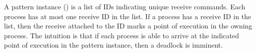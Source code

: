 A pattern instance (\rcvp) is a list of IDs indicating unique receive commands. Each process has at most one
receive ID in the list. If a process has a receive ID in the list, then the receive attached to the ID marks a point of execution in
the owning process. The intuition is that if each process is able to
arrive at the indicated point of execution in the pattern instance, then a deadlock is imminent.








\newsavebox{\boxLangSyntax}

\begin{lrbox}{\boxLangSyntax}
\begin{minipage}[c]{0.3\linewidth}
\cfgstart
{}
\cfgrule{\thread}{\lp\cfgnt{\cmd}~$\ldots$~$\bot$\rp}
\cfgrule{\cmd}{\lp\cfgt{\sendi}~\cfgt{\aid}~\cfgt{\num}~\cfgt{\num}\rp}
   \cfgorline{\lp\cfgt{\recvi}~\cfgt{\aid}~\cfgt{\num}~\cfgt{\num}~\cfgt{\aid}\rp}
   \cfgorline{\lp\cfgt{\wait}~\cfgt{\aid}\rp}
   \cfgorline{\lp\cfgt{\barrier}~\cfgt{\aid}\rp}
\
    \cfgorline{\cfgt{$\ast$}}
\cfgrule{\rcvp}{\lp\aid~$\ldots$\rp}
\cfgend
\end{minipage}
\end{lrbox}


\newsavebox{\boxEvalSyntax}
\begin{lrbox}{\boxEvalSyntax}
\begin{minipage}[c]{0.3\linewidth}
\cfgstart
{}
\cfgrule{\epsnd}{\cfgt{\mt}\
   \cfgor\lp\cfgnt{\epsnd}~\lb\lp\cfgt{\num}\ \cfgt{\num}\rp~$\rightarrow$~\cfgt{\num}\rb\rp}
\cfgrule{\eprcv}{\cfgt{\mt}\
   \cfgor\lp\cfgnt{\eprcv}~\lb\lp\cfgt{\num}\ \cfgt{\num}\rp~$\rightarrow$~\cfgt{\num}\rb\rp}
\cfgrule{\epbarrier}{\cfgt{\mt}\
   \cfgor\lp\cfgnt{\epbarrier}~\lb\cfgnt{\aid}~$\rightarrow$~\cfgt{\num}\rb\rp}
\cfgend
\end{minipage}
\end{lrbox}


